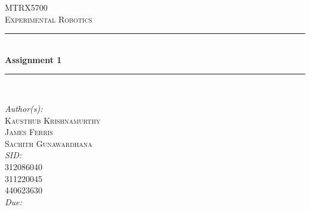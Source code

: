 \begin{titlepage}
	\newcommand{\HRule}{\rule{\linewidth}{0.5mm}}
	\center
	\textsc{\LARGE MTRX5700 \\[0.5cm]Experimental Robotics}\\[1cm] 
	\HRule \\[0.4cm]
	{ \huge \bfseries Assignment 1}\\[0.4cm] 
	\HRule \\[1.5cm]
	\begin{minipage}{1\textwidth}
		\large
		\flushleft
		\emph{Author(s):}\hspace{0.2cm}\textsc{\\Kausthub Krishnamurthy\\James Ferris\\Sachith Gunawardhana}\\ [0.25cm]
		\emph{SID:}\hspace{0.7cm}	\\312086040\\311220045\\440623630\\[0.5cm]
		\emph{Due:}
		\hspace{0.55cm}{March 25, 2015}\hspace{1cm}\\[3cm]	%
	\end{minipage}
	\vfill
\end{titlepage}